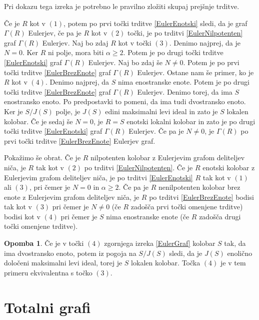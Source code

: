 \documentclass[a4paper, 12pt]{amsart}
\theoremstyle{definition} %
\newtheorem{opomba}[definicija]{Opomba}
\theoremstyle{plain} %
\begin{document}
\proof
Pri dokazu tega izreka je potrebno le pravilno zložiti skupaj prejšnje trditve. 

Če je $R$ kot v $(1)$, potem po prvi točki trditve \ref{EulerEnotski} sledi, da je graf $\Gamma(R)$ Eulerjev, če pa je $R$ kot v $(2)$ točki, je po trditvi \ref{EulerNilpotenten} graf $\Gamma(R)$ Eulerjev. Naj bo zdaj $R$ kot v točki $(3)$. Denimo najprej, da je $N=0$. Ker $R$ ni polje, mora biti $\alpha \ge 2$. Potem je po drugi točki trditve \ref{EulerEnotski} graf $\Gamma(R)$ Eulerjev. Naj bo zdaj še $N\neq 0$. Potem je po prvi točki trditve \ref{EulerBrezEnote} graf $\Gamma(R)$ Eulerjev. Ostane nam še primer, ko je $R$ kot v $(4)$. Denimo najprej, da $S$ nima enostranske enote. Potem je po drugi točki trditve \ref{EulerBrezEnote} graf $\Gamma(R)$ Eulerjev. Denimo torej, da ima $S$ enostransko enoto. Po predpostavki to pomeni, da ima tudi dvostransko enoto. Ker je $S/J(S)$ polje, je $J(S)$ edini maksimalni levi ideal in zato je $S$ lokalen kolobar. Če je sedaj še $N=0$, je $R=S$ enotski lokalni kolobar in zato je po drugi točki trditve \ref{EulerEnotski} graf $\Gamma(R)$ Eulerjev. Če pa je $N\neq 0$, je $\Gamma(R)$ po prvi točki trditve \ref{EulerBrezEnote} Eulerjev graf.

Pokažimo še obrat. 
Če je $R$ nilpotenten kolobar z Eulerjevim grafom deliteljev niča, je $R$ tak kot v $(2)$ po trditvi \ref{EulerNilpotenten}. Če je $R$ enotski kolobar z Eulerjevim grafom deliteljev niča, je po trditvi \ref{EulerEnotski} $R$ tak kot v $(1)$ ali $(3)$, pri čemer je $N=0$ in $\alpha \ge 2$. Če pa je $R$ nenilpotenten kolobar brez enote z Eulerjevim grafom deliteljev niča, je $R$ po trditvi \ref{EulerBrezEnote} bodisi tak kot v $(3)$ pri čemer je $N\neq 0$ (če $R$ zadošča prvi točki omenjene trditve) bodisi kot v $(4)$ pri čemer je $S$ nima enostranske enote (če $R$ zadošča drugi točki omenjene trditve). 

\endproof

\begin{opomba}
Če je v točki $(4)$ zgornjega izreka \ref{EulerGraf} kolobar $S$ tak, da ima dvostransko enoto, potem iz pogoja na $S/J(S)$ sledi, da je $J(S)$ enolično določeni maksimalni levi ideal, torej je $S$ lokalen kolobar. Točka $(4)$  je v tem primeru ekvivalentna s točko $(3)$.
\end{opomba}

\section{Totalni grafi}
\end{document}
